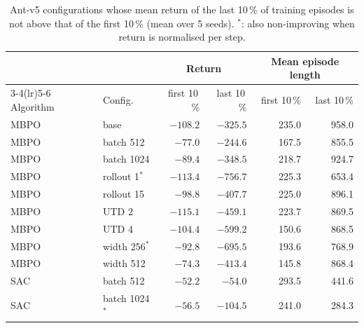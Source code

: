 \begin{table}[tb]
  \centering
  \caption{Ant-v5 configurations whose mean return of the last 10\,\% of training episodes is not above that of the first 10\,\% (mean over 5 seeds).
    $^\ast$: also non-improving when return is normalised per step.}
  \label{tab:app-learning}
  \small
  \begin{tabular}{llrrrr}
    \toprule
              &                   & \multicolumn{2}{c}{Return} & \multicolumn{2}{c}{Mean episode length}                              \\
    \cmidrule(lr){3-4}\cmidrule(lr){5-6}
    Algorithm & Config.           & first 10\,\%               & last 10\,\%                             & first 10\,\% & last 10\,\% \\
    \midrule
    MBPO      & base              & $-108.2$                   & $-325.5$                                & 235.0        & 958.0       \\
    MBPO      & batch 512         & $-77.0$                    & $-244.6$                                & 167.5        & 855.5       \\
    MBPO      & batch 1024        & $-89.4$                    & $-348.5$                                & 218.7        & 924.7       \\
    MBPO      & rollout 1$^\ast$  & $-113.4$                   & $-756.7$                                & 225.3        & 653.4       \\
    MBPO      & rollout 15        & $-98.8$                    & $-407.7$                                & 225.0        & 896.1       \\
    MBPO      & UTD 2             & $-115.1$                   & $-459.1$                                & 223.7        & 869.5       \\
    MBPO      & UTD 4             & $-104.4$                   & $-599.2$                                & 150.6        & 868.5       \\
    MBPO      & width 256$^\ast$  & $-92.8$                    & $-695.5$                                & 193.6        & 768.9       \\
    MBPO      & width 512         & $-74.3$                    & $-413.4$                                & 145.8        & 868.4       \\
    SAC       & batch 512         & $-52.2$                    & $-54.0$                                 & 293.5        & 441.6       \\
    SAC       & batch 1024$^\ast$ & $-56.5$                    & $-104.5$                                & 241.0        & 284.3       \\

\end{tabular}
\end{table}
